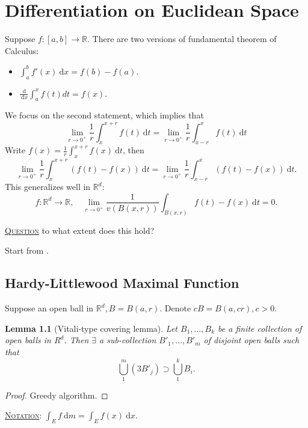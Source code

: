 \documentclass{report}
\newcommand{\R}{\mathbb{R}}
\newcommand{\df}{\ \mathrm{d}}
\newcommand{\fancyem}[1]{\underline{\textsc{#1}}}
\newtheorem{lemma}[theorem]{Lemma}
\theoremstyle{definition}
\theoremstyle{remark}
\begin{document}
\chapter{Differentiation on Euclidean Space}
Suppose $f: [a, b] \to \R$. There are two versions of fundamental theorem of Calculus:
\begin{itemize}
	\item $\displaystyle \int_a^b f'(x) \df x = f(b) - f(a)$.
	\item $\displaystyle \frac{\df}{\df x}\int_a^x f(t)dt = f(x)$.
\end{itemize}
We focus on the second statement, which implies that
\[
	\lim_{r \to 0^+} \frac{1}{r} \int_x^{x + r} f(t) \df t = \lim_{r \to 0^+} \frac{1}{r} \int_{x - r}^x f(t) \df t
\]
Write $\displaystyle f(x) = \frac{1}{r}\int_x^{x + r}f(x) \df t$, then
\[
	\lim_{r \to 0^+} \frac{1}{r} \int_x^{x + r} (f(t) - f(x)) \df t = \lim_{r \to 0^+} \frac{1}{r} \int_{x - r}^x (f(t) - f(x)) \df t.
\]
This generalizes well in $\R^d$:
\[
f: \R^d \to \R, \quad \lim_{r \to 0^+}	\frac{1}{v(B(x, r))} \int_{B(x, r)} f(t) - f(x) \df t = 0.
\]

\fancyem{Question} to what extent does this hold?

Start from \cite[3.4]{follandRealAnalysisModern1999}.
\section{Hardy-Littlewood Maximal Function}
Suppose an open ball in $\R^d, B = B(a, r)$. Denote $cB = B(a, cr), c > 0$.
\begin{lemma}[Vitali-type covering lemma]
	Let $B_1, \ldots, B_k$ be a finite collection of open balls in $R^d$. Then $\exists$ a sub-collection $B'_1, \ldots, B'_m$ of \emph{disjoint} open balls such that
	\[
		\bigcup_1^m(3B'_j) \supset \bigcup_1^k B_i.	
	\]
\end{lemma}
\begin{proof}
	Greedy algorithm.
\end{proof}

\fancyem{Notation}: $\displaystyle \int_E f \df m = \int_E f(x)\df x$.
\end{document}
